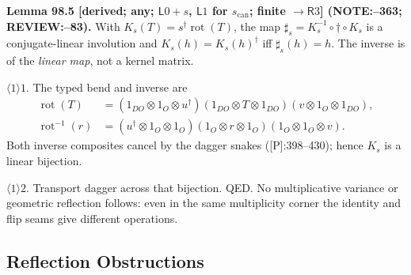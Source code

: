 \textbf{Lemma 98.5 [derived; any; \(\mathsf L0+s\), \(\mathsf L1\) for \(s_{\mathrm{can}}\); finite \(\to\mathsf R3\)] (NOTE:--363; REVIEW:--83).}
With \(K_s(T)=s^\dagger\operatorname{rot}(T)\), the map
\(\sharp_s=K_s^{-1}\circ\dagger\circ K_s\) is a conjugate-linear involution and
\(K_s(h)=K_s(h)^\dagger\) iff \(\sharp_s(h)=h\). The inverse is of the \emph{linear map}, not a kernel matrix.
\par\(\langle1\rangle1\). The typed bend and inverse are
\[
\begin{aligned}
 \operatorname{rot}(T)&=(1_{DO}\otimes1_O\otimes u^\dagger)(1_{DO}\otimes T\otimes1_{DO})(v\otimes1_O\otimes1_{DO}),\\
 \operatorname{rot}^{-1}(r)&=(u^\dagger\otimes1_O\otimes1_O)(1_O\otimes r\otimes1_O)(1_O\otimes1_O\otimes v).
\end{aligned}
\]
Both inverse composites cancel by the dagger snakes ([P]:398--430); hence \(K_s\) is a linear bijection.
\par\(\langle1\rangle2\). Transport dagger across that bijection. QED. No multiplicative variance or geometric
reflection follows: even in the same multiplicity corner the identity and flip seams give different operations.

\subsection{Reflection Obstructions}

